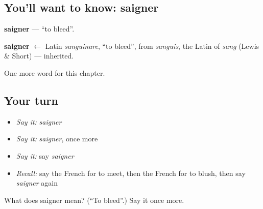 \subsection*{You'll want to know: saigner}
\textbf{saigner} — \textquotedblleft{}to bleed\textquotedblright{}.

\begin{cousinweb}
\textbf{saigner} $\leftarrow$ Latin \emph{sanguinare}, \textquotedblleft{}to bleed\textquotedblright{}, from \emph{sanguis}, the Latin of \emph{sang} (Lewis \& Short) — inherited.
\end{cousinweb}

\begin{grammarlens}[title={What you've built}]
One more word for this chapter.
\end{grammarlens}

\subsection*{Your turn}
\begin{itemize}
\raggedright
  \item \emph{Say it:} \emph{saigner}
  \item \emph{Say it:} \emph{saigner}, once more
  \item \emph{Say it:} say \emph{saigner}
  \item \emph{Recall:} say the French for to meet, then the French for to blush, then say \emph{saigner} again
\end{itemize}

\begin{tcolorbox}[breakable,colback=teal!4,colframe=teal!35!black,title={Before you move on}]
What does saigner mean? (\textquotedblleft{}To bleed\textquotedblright{}.) Say it once more.
\end{tcolorbox}
